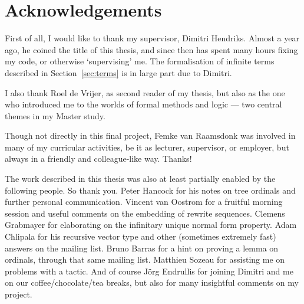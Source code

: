\chapter*{Acknowledgements}
\thispagestyle{empty}

First of all, I would like to thank my supervisor, Dimitri
Hendriks. Almost a year ago, he coined the title of this thesis, and
since then has spent many hours fixing my \Coq code, or otherwise
`supervising' me. The formalisation of infinite terms described in
Section~\ref{sec:terms} is in large part due to Dimitri.

I also thank Roel de Vrijer, as second reader of my thesis, but also
as the one who introduced me to the worlds of formal methods and
logic --- two central themes in my Master study.

Though not directly in this final project, Femke van Raamsdonk was
involved in many of my curricular activities, be it as lecturer,
supervisor, or employer, but always in a friendly and colleague-like
way. Thanks!

The work described in this thesis was also at least partially enabled
by the following people. So thank you. Peter Hancock for his notes on
tree ordinals and further personal communication. Vincent van Oostrom
for a fruitful morning session and useful comments on the embedding of
rewrite sequences. Clemens Grabmayer for elaborating on the infinitary
unique normal form property. Adam Chlipala for his recursive vector type and
other (sometimes extremely fast) answers on the \Coq mailing
list. Bruno Barras for a hint on proving a lemma on ordinals, through
that same mailing list. Matthieu Sozeau for assisting me on problems
with a \Coq tactic. And of course J\"org Endrullis for joining Dimitri
and me on our coffee/chocolate/tea breaks, but also for many insightful
comments on my project.

